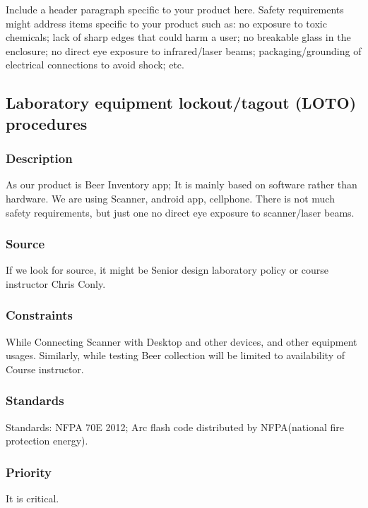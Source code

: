 Include a header paragraph specific to your product here. Safety requirements might address items specific to your product such as: no exposure to toxic chemicals; lack of sharp edges that could harm a user; no breakable glass in the enclosure; no direct eye exposure to infrared/laser beams; packaging/grounding of electrical connections to avoid shock; etc.

\subsection{Laboratory equipment lockout/tagout (LOTO) procedures}
\subsubsection{Description}
 As our product is Beer Inventory app; It is mainly based on software rather than hardware. We are using Scanner, android app, cellphone. There is not much safety requirements, but just one no direct eye exposure to scanner/laser beams. 
\subsubsection{Source}
If we look for source, it might be Senior design laboratory policy or course instructor Chris Conly. 
\subsubsection{Constraints}
While Connecting Scanner with Desktop and other devices, and other equipment usages. Similarly, while testing Beer collection will be limited to availability of Course instructor.
\subsubsection{Standards}
Standards: NFPA 70E 2012; Arc flash code distributed by NFPA(national fire protection energy).
\subsubsection{Priority}
It is critical.


